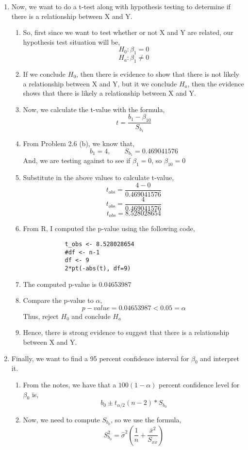 \documentclass{article}
\begin{document}
\begin{enumerate}[label = \alph*)]
\begin{enumerate}[label = \arabic*)]
		\end{enumerate}
		\item Now, we want to do a t-test along with hypothesis testing to determine if there is a relationship between X and Y.
		\begin{enumerate}[label = \arabic*)]
			\item So, first since we want to test whether or not X and Y are related, our hypothesis test situation will be,
			\[H_0: \beta_1 = 0\]
			\[H_a: \beta_1 \neq 0\]
			\item If we conclude $H_0$, then there is evidence to show that there is not likely a relationship between X and Y, but it we conclude $H_a$, then the evidence shows that there is likely a relationship between X and Y.
			\item Now, we calculate the t-value with the formula,
			\[t = \frac{b_1 - \beta_{10}}{S_{b_1}}\]
			\item From Problem 2.6 (b), we know that,
			\[b_1 = 4, \qquad S_{b_1} = 0.469041576\]
			And, we are testing against to see if $\beta_1 =0$, so $\beta_{10} = 0$
			\item Substitute in the above values to calculate t-value,
			\[t_{obs} = \frac{4-0}{0.469041576}\]
			\[t_{obs} = \frac{4}{0.469041576}\]
			\[t_{obs} = 8.528028654\]
			\item From R, I computed the p-value using the following code,
			\begin{lstlisting}
			t_obs <- 8.528028654
			#df <- n-1
			df <- 9
			2*pt(-abs(t), df=9)
			\end{lstlisting}
			\item The computed p-value is 0.04653987
			\item Compare the p-value to $\alpha$,
			\[p-value = 0.04653987 < 0.05 = \alpha\]
			Thus, reject $H_0$ and conclude $H_a$
			\item Hence, there is strong evidence to suggest that there is a relationship between X and Y.
		\end{enumerate}
		\item Finally, we want to find a 95 percent confidence interval for $\beta_0$ and interpret it.
		\begin{enumerate}[label = \arabic*)]
			\item From the notes, we have that a $100(1-\alpha)$ percent confidence level for $\beta_0$ is,
			\[b_0 \pm t_{\alpha/2}(n-2)*S_{b_0}\]
			\item Now, we need to compute $S_{b_0}$, so we use the formula,
			\[S_{b_0}^2 = \hat{\sigma}^2(\frac{1}{n}+\frac{\bar{x}^2}{S_{xx}})\]

\end{enumerate}
\end{enumerate}
\end{document}
